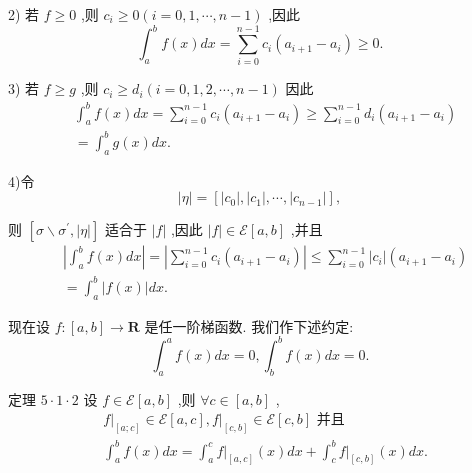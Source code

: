 2) 若 $f \geq  0$ ,则 ${c}_{i} \geq  0\left( {i = 0,1,\cdots ,n - 1}\right)$ ,因此
$${\int }_{a}^{b}f\left( x\right) {dx} = \mathop{\sum }\limits_{{i = 0}}^{{n - 1}}{c}_{i}\left( {{a}_{i + 1} - {a}_{i}}\right)  \geq  0.$$

3) 若 $f \geq  g$ ,则 ${c}_{i} \geq  {d}_{i}\left( {i = 0,1,2,\cdots ,n - 1}\right)$ 因此
\begin{align*}
	&{\int }_{a}^{b}f\left( x\right) {dx} = \mathop{\sum }\limits_{{i = 0}}^{{n - 1}}{c}_{i}\left( {{a}_{i + 1} - {a}_{i}}\right)  \geq  \mathop{\sum }\limits_{{i = 0}}^{{n - 1}}{d}_{i}\left( {{a}_{i + 1} - {a}_{i}}\right)\\
	&= {\int }_{a}^{b}g\left( x\right) {dx}.
\end{align*}

4)令
$$\left| \eta \right|  = \left\lbrack  {\left| {c}_{0}\right| ,\left| {c}_{1}\right| ,\cdots ,\left| {c}_{n - 1}\right| }\right\rbrack  ,$$

则 $\left\lbrack  {\sigma  \smallsetminus  {\sigma }^{\prime },\left| \eta \right| }\right\rbrack$ 适合于 $\left| f\right|$ ,因此 $\left| f\right|  \in  \mathcal{E}\left\lbrack  {a,b}\right\rbrack$ ,并且
\begin{align*}
	&\left| {{\int }_{a}^{b}f\left( x\right) {dx}}\right|  = \left| {\mathop{\sum }\limits_{{i = 0}}^{{n - 1}}{c}_{i}\left( {{a}_{i + 1} - {a}_{i}}\right) }\right|  \leq  \mathop{\sum }\limits_{{i = 0}}^{{n - 1}}\left| {c}_{i}\right| \left( {{a}_{i + 1} - {a}_{i}}\right)\\
	&= {\int }_{a}^{b}\left| {f\left( x\right) }\right| {dx}.
\end{align*}

现在设 $f : \left\lbrack  {a,b}\right\rbrack   \rightarrow  \mathbf{R}$ 是任一阶梯函数. 我们作下述约定:
$${\int }_{a}^{a}f\left( x\right) {dx} = 0,{\int }_{b}^{b}f\left( x\right) {dx} = 0.$$

定理 $5 \cdot  1 \cdot  2$ 设 $f \in  \mathcal{E}\left\lbrack  {a,b}\right\rbrack$ ,则 $\forall c \in  \left\lbrack  {a,b}\right\rbrack$ ,
\begin{align*}
	&{\left. f\right| }_{\left\lbrack  a;c\right\rbrack  } \in  \mathcal{E}\left\lbrack  {a,c}\right\rbrack  ,{\left. f\right| }_{\left\lbrack  c,b\right\rbrack  } \in  \mathcal{E}\left\lbrack  {c,b}\right\rbrack  \text{ 并且 }\\
	&{\int }_{a}^{b}f\left( x\right) {dx} = {\int }_{a}^{c}{\left. f\right| }_{\left\lbrack  a,c\right\rbrack  }\left( x\right) {dx} + {\int }_{c}^{b}{\left. f\right| }_{\left\lbrack  c,b\right\rbrack  }\left( x\right) {dx}.
\end{align*}

